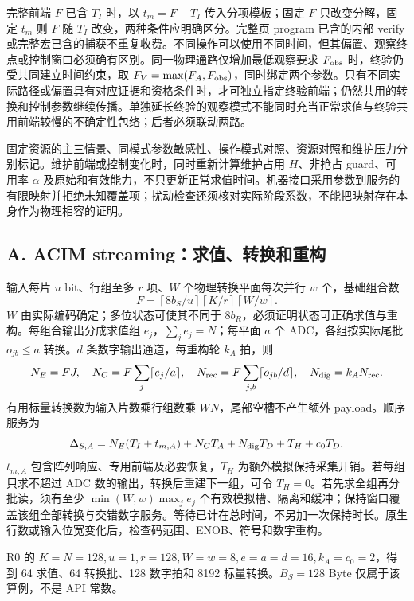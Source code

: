 完整前端 $F$ 已含 $T_I$ 时，以 $t_m=F-T_I$ 传入分项模板；固定 $F$ 只改变分解，固定 $t_m$ 则 $F$ 随 $T_I$ 改变，两种条件应明确区分。完整页 program 已含的内部 verify 或完整宏已含的捕获不重复收费。不同操作可以使用不同时间，但其偏置、观察终点或控制窗口必须确有区别。同一物理通路仅增加最低观察要求 $F_{\rm obs}$ 时，终验仍受共同建立时间约束，取 $F_V=\max(F_A,F_{\rm obs})$，同时绑定两个参数。只有不同实际路径或偏置具有对应证据和资格条件时，才可独立指定终验前端；仍然共用的转换和控制参数继续传播。单独延长终验的观察模式不能同时充当正常求值与终验共用前端较慢的不确定性包络；后者必须联动两路。

固定资源的主三情景、同模式参数敏感性、操作模式对照、资源对照和维护压力分别标记。维护前端或控制变化时，同时重新计算维护占用 $H$、非抢占 guard、可用率 $\alpha$ 及原始和有效能力，不只更新正常求值时间。机器接口采用参数到服务的有限映射并拒绝未知覆盖项；扰动检查还须核对实际阶段系数，不能把映射存在本身作为物理相容的证明。

\subsection{A. ACIM streaming：求值、转换和重构}

输入每片 $u$ bit、行组至多 $r$ 项、$W$ 个物理转换平面每次并行 $w$ 个，基础组合数
\[
F=\left\lceil8b_S/u\right\rceil\left\lceil K/r\right\rceil\left\lceil W/w\right\rceil.
\]
$W$ 由实际编码确定；多位状态可使其不同于 $8b_R$，必须证明状态可正确求值与重构。每组合输出分成求值组 $e_j$，$\sum_j e_j=N$；每平面 $a$ 个 ADC，各组按实际尾批 $o_{jb}\leq a$ 转换。$d$ 条数字输出通道，每重构轮 $k_A$ 拍，则
\begin{equation}
N_E=FJ,\quad N_C=F\sum_j\lceil e_j/a\rceil,\quad
N_{\rm rec}=F\sum_{j,b}\lceil o_{jb}/d\rceil,\quad N_{\rm dig}=k_A N_{\rm rec}.
\label{eq:acount}
\end{equation}
有用标量转换数为输入片数乘行组数乘 $WN$，尾部空槽不产生额外 payload。顺序服务为
\begin{equation}
\Delta_{S,A}=N_E(T_I+t_{m,A})+N_CT_A+N_{\rm dig}T_D+T_H+c_0T_D.
\label{eq:acim}
\end{equation}
$t_{m,A}$ 包含阵列响应、专用前端及必要恢复，$T_H$ 为额外模拟保持采集开销。若每组只求不超过 ADC 数的输出，转换后重建下一组，可令 $T_H=0$。若先求全组再分批读，须有至少 $\min(W,w)\max_j e_j$ 个有效模拟槽、隔离和缓冲；保持窗口覆盖该组全部转换与交错数字服务。等待已计在总时间，不另加一次保持时长。原生行数或输入位宽变化后，检查码范围、ENOB、符号和数字重构。

R0 的 $K=N=128,u=1,r=128,W=w=8,e=a=d=16,k_A=c_0=2$，得到 64 求值、64 转换批、128 数字拍和 8192 标量转换。$B_S=128$ Byte 仅属于该算例，不是 API 常数。

